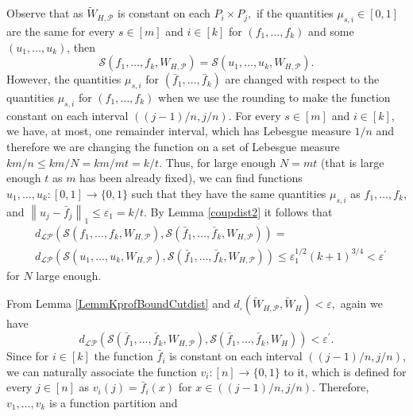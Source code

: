\documentclass[11pt]{article}
\newcommand{\cP}{{\mathcal P}}  %
\newcommand{\cS}{{\mathcal S}}  %
\begin{document}

Observe that as  $\widetilde{W}_{H,\cP}$ is constant on each $P_i \times P_j,$ if the quantities $\mu_{s, i}\in [0,1]$ are the same for every $s\in [m]$ and $i\in [k]$ for $\left(f_1, \ldots, f_k\right)$ and some $\left(u_1, \ldots, u_k\right)$, then
$$
\cS\left(f_1, \ldots, f_k, W_{H,\cP}\right)=\cS\left(u_1, \ldots, u_k, W_{H,\cP}\right) .
$$
However, the quantities $\mu_{s, i}$ for $(\bar{f}_1, \ldots, \bar{f}_k)$ are changed with respect to the quantities $\mu_{s, i}$ for $(f_1, \ldots, f_k)$ when we use the rounding to make the function constant on each interval $((j-1) / n, j / n)$. For every $s\in [m]$ and $i\in [k]$, we have, at most, one remainder interval, which has Lebesgue measure $1/n$ and therefore we are changing the function on a set of Lebesgue measure $km/n\leq km/N=km/mt=k/t.$ Thus, for large enough $N=mt$ (that is large enough $t$ as $m$ has been already fixed), we can find functions $u_1, \ldots, u_k:[0,1] \rightarrow \{0,1\}$ such that they have the same quantities $\mu_{s, i}$ as $f_1, \ldots, f_k$, and $\left\|u_j-\bar{f}_j\right\|_1 \leq \varepsilon_1=k/t$. By Lemma \ref{coupdist2} it follows that
$$
\begin{aligned}
&d_{\mathcal{LP}}\left(\cS(f_1, \ldots, f_k, W_{H,\cP}), \cS(\bar{f}_1, \ldots, \bar{f}_k,W_{H,\cP})\right) =\\
&d_{\mathcal{LP}}\left(\cS(u_1, \ldots, u_k, W_{H,\cP}), \cS(\bar{f}_1, \ldots, \bar{f}_k,W_{H,\cP})\right)\leq \varepsilon^{1/2}_1(k+1)^{3/4}<\varepsilon^{\prime}
\end{aligned}
$$
for $N$ large enough.

From Lemma \ref{LemmKprofBoundCutdist} and $d_{\square}(\widetilde W_{H,\cP},\widetilde W_{H})<\varepsilon,$ again we have $$
d_{\mathcal{LP}}(\cS(\bar{f}_1, \ldots, \bar{f}_k,W_{H,\cP}),\cS(\bar{f}_1, \ldots, \bar{f}_k,W_{H}))<\varepsilon^{\prime}.
$$
Since for $i\in [k]$ the function $\bar{f}_i$ is constant on each interval $((j-1)/ n,j / n)$, we can naturally associate the function $v_i:[n] \rightarrow \{0,1\}$ to it, which is defined for every $j\in [n]$ as $v_i(j)=\bar{f}_i(x)$ for $x\in((j-1)/ n,j / n) .$  Therefore, $v_1,\ldots, v_k$ is a function partition and 
\end{document}
